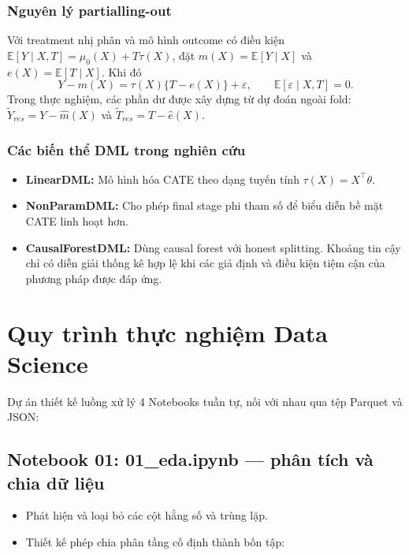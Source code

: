 \documentclass[11pt,a4paper]{article}
\newcommand{\Exp}{\mathbb{E}}
\DeclareRobustCommand{\code}[1]{{\small\texttt{#1}}}
\def\code#1{#1}%
\begin{document}
\subsubsection{Nguyên lý partialling-out}
Với treatment nhị phân và mô hình outcome có điều kiện
$\Exp[Y\mid X,T]=\mu_0(X)+T\tau(X)$, đặt
$m(X)=\Exp[Y\mid X]$ và $e(X)=\Exp[T\mid X]$. Khi đó
\[
Y-m(X)=\tau(X)\{T-e(X)\}+\varepsilon,
\qquad \Exp[\varepsilon\mid X,T]=0.
\]
Trong thực nghiệm, các phần dư được xây dựng từ dự đoán ngoài fold:
$\tilde Y_{res}=Y-\hat m(X)$ và $\tilde T_{res}=T-\hat e(X)$.

\subsubsection{Các biến thể DML trong nghiên cứu}
\begin{itemize}
    \item \textbf{LinearDML:} Mô hình hóa CATE theo dạng tuyến tính
    $\tau(X)=X^\top\theta$.
    \item \textbf{NonParamDML:} Cho phép final stage phi tham số để biểu diễn
    bề mặt CATE linh hoạt hơn.
    \item \textbf{CausalForestDML:} Dùng causal forest với honest splitting.
    Khoảng tin cậy chỉ có diễn giải thống kê hợp lệ khi các giả định và điều
    kiện tiệm cận của phương pháp được đáp ứng.
\end{itemize}

\section{Quy trình thực nghiệm Data Science}

Dự án thiết kế luồng xử lý 4 Notebooks tuần tự, nối với nhau qua tệp Parquet và JSON:

\subsection{Notebook 01: \code{01\_eda.ipynb} --- phân tích và chia dữ liệu}
\begin{itemize}
    \item Phát hiện và loại bỏ các cột hằng số và trùng lặp.
    \item Thiết kế phép chia phân tầng cố định thành bốn tập:
\end{itemize}
\end{document}
